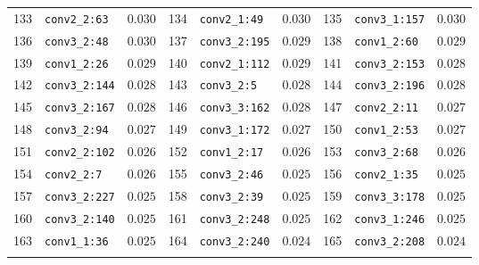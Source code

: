 \begin{center}
\begin{longtable}{c l l | c l l | c l l }
        133 & \texttt{conv2\_2:63} & $0.030$ & 134 & \texttt{conv2\_1:49} & $0.030$ & 135 & \texttt{conv3\_1:157} & $0.030$ \\
        136 & \texttt{conv3\_2:48} & $0.030$ & 137 & \texttt{conv3\_2:195} & $0.029$ & 138 & \texttt{conv1\_2:60} & $0.029$ \\
        139 & \texttt{conv1\_2:26} & $0.029$ & 140 & \texttt{conv2\_1:112} & $0.029$ & 141 & \texttt{conv3\_2:153} & $0.028$ \\
        142 & \texttt{conv3\_2:144} & $0.028$ & 143 & \texttt{conv3\_2:5} & $0.028$ & 144 & \texttt{conv3\_2:196} & $0.028$ \\
        145 & \texttt{conv3\_2:167} & $0.028$ & 146 & \texttt{conv3\_3:162} & $0.028$ & 147 & \texttt{conv2\_2:11} & $0.027$ \\
        148 & \texttt{conv3\_2:94} & $0.027$ & 149 & \texttt{conv3\_1:172} & $0.027$ & 150 & \texttt{conv1\_2:53} & $0.027$ \\
        151 & \texttt{conv2\_2:102} & $0.026$ & 152 & \texttt{conv1\_2:17} & $0.026$ & 153 & \texttt{conv3\_2:68} & $0.026$ \\
        154 & \texttt{conv2\_2:7} & $0.026$ & 155 & \texttt{conv3\_2:46} & $0.025$ & 156 & \texttt{conv2\_1:35} & $0.025$ \\
        157 & \texttt{conv3\_2:227} & $0.025$ & 158 & \texttt{conv3\_2:39} & $0.025$ & 159 & \texttt{conv3\_3:178} & $0.025$ \\
        160 & \texttt{conv3\_2:140} & $0.025$ & 161 & \texttt{conv3\_2:248} & $0.025$ & 162 & \texttt{conv3\_1:246} & $0.025$ \\
        163 & \texttt{conv1\_1:36} & $0.025$ & 164 & \texttt{conv3\_2:240} & $0.024$ & 165 & \texttt{conv3\_2:208} & $0.024$ \\
        \hline
    \label{tbl:spectrograms_full}
\end{longtable}
\end{center}